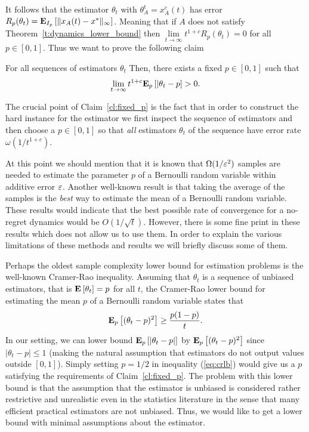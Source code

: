 %
It follows that the estimator $\theta_t$ with $\theta_A^t = x_A^c(t)$
has error $R_p(\theta_t)=\bm{\mathrm{E}}_{I_p} \left[ \| x_A(t)-x^* \|_{\infty} \right]$.
Meaning that if $A$ does not satisfy Theorem~\ref{t:dynamics_lower_bound}
then $\lim\limits_{t \rightarrow \infty}t^{1+c}R_p(\theta_t)=0$ for all
$p \in [0,1]$. Thus we want to prove the following claim
\begin{claim}\label{cl:fixed_p}
  For all sequences of estimators $\theta_t$
  Then, there exists a fixed $p \in [0,1]$ such that
  \[
    \lim_{t \to \infty} t^{1+c} \bm{\mathrm{E}}_{p} \left[ |\theta_t - p \right] > 0.
  \]
\end{claim}
The crucial point of Claim~\ref{cl:fixed_p} is the fact that
in order to construct the hard instance for the estimator
we first inspect the sequence of estimators and then choose
a $p \in [0,1]$ so that \emph{all} estimators $\theta_t$ of
the sequence have error rate $\omega(1/t^{1+c})$.

At this point we should mention that it is known
that $\Omega(1/\varepsilon^2)$ samples are needed to estimate the parameter $p$
of a Bernoulli random variable within additive error $\varepsilon$.
Another well-known result is that taking the average of the samples
is the \emph{best} way to estimate the mean of a Bernoulli random variable.
These results would indicate that the best possible rate of convergence
for a no-regret dynamics would be $O(1/\sqrt{t})$.
However, there is some fine print in these results which does not allow us
to use them. In order to explain the various limitations of
these methods and results we will briefly discuss some of them.

Perhaps the oldest sample complexity lower bound for estimation problems
is the well-known Cramer-Rao inequality.
Assuming that $\theta_t$ is a sequence of unbiased estimators,
that is $\Exp{\theta_t} = p$ for all $t$, the Cramer-Rao lower bound
for estimating the mean $p$ of a Bernoulli random variable states
that
\begin{equation}\label{eq:crlb}
  \bm{\mathrm{E}}_{p} \left[ (\theta_t - p)^2 \right] \geq \frac{p(1-p)}{t}.
\end{equation}
In our setting, we can lower bound $\bm{\mathrm{E}}_{p} \left[ |\theta_t - p| \right]$ by
$\bm{\mathrm{E}}_{p} \left[ (\theta_t - p)^2 \right]$ since $|\theta_t - p| \leq 1$
(making the natural assumption that estimators do not output values outside
$[0,1]$).
Simply setting $p=1/2$ in inequality (\ref{eq:crlb}) would give us a
$p$ satisfying the requirements of Claim~\ref{cl:fixed_p}.
The problem with this lower bound is that the assumption that the estimator
is unbiased is considered rather restrictive and unrealistic even in
the statistics literature in the sense that many efficient practical
estimators are not unbiased.  Thus, we would like to get a lower bound
with minimal assumptions about the estimator.

